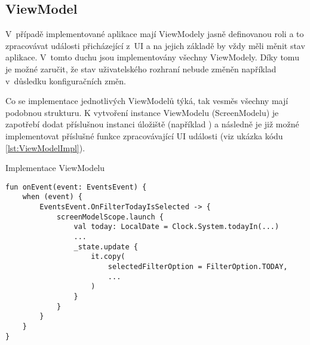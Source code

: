 \subsection{ViewModel} \label{ViewModelImpl}

V~případě implementované aplikace mají ViewModely jasně definovanou roli a to zpracovávat události přicházející z~UI a na jejich základě 
by vždy měli měnit stav aplikace. \cite{viewmodelEvents} V~tomto duchu jsou implementovány všechny ViewModely. Díky tomu je možné 
zaručit, že stav uživatelského rozhraní nebude změněn například v~důsledku konfiguračních změn. 

Co se implementace jednotlivých ViewModelů týká, tak vesměs všechny mají podobnou strukturu. K vytvoření instance ViewModelu (ScreenModelu)
je zapotřebí dodat příslušnou instanci úložiště (například ) a následně je již možné implementovat příslušné funkce
zpracovávající UI události (viz ukázka kódu \ref{lst:ViewModelImpl}). 


\begin{listing}[H]
\caption{Implementace ViewModelu}\label{lst:ViewModelImpl}
\begin{verbatim}
fun onEvent(event: EventsEvent) {
    when (event) {
        EventsEvent.OnFilterTodayIsSelected -> {
            screenModelScope.launch {
                val today: LocalDate = Clock.System.todayIn(...)
                ...
                _state.update {
                    it.copy(
                        selectedFilterOption = FilterOption.TODAY,
                        ...
                    )
                }
            }
        }
    }
}
\end{verbatim}
\end{listing}




